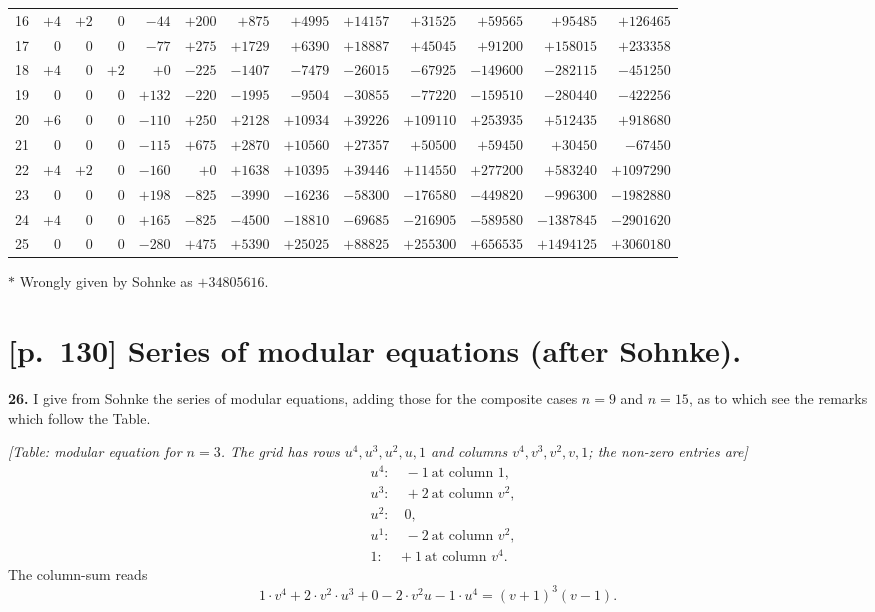 \documentclass[11pt]{article}
\providecommand{\asterism}{*}
\begin{document}
\begin{table}
\begin{tabular}{r|r|r|r|r|r|r|r|r|r|r|r|r}
16 & $+4$ & $+2$ & $0$ & $-44$ & $+200$ & $+875$ & $+4995$ & $+14157$ & $+31525$ & $+59565$ & $+95485$ & $+126465$ \\
17 & $0$ & $0$ & $0$ & $-77$ & $+275$ & $+1729$ & $+6390$ & $+18887$ & $+45045$ & $+91200$ & $+158015$ & $+233358$ \\
18 & $+4$ & $0$ & $+2$ & $+0$ & $-225$ & $-1407$ & $-7479$ & $-26015$ & $-67925$ & $-149600$ & $-282115$ & $-451250$ \\
19 & $0$ & $0$ & $0$ & $+132$ & $-220$ & $-1995$ & $-9504$ & $-30855$ & $-77220$ & $-159510$ & $-280440$ & $-422256$ \\
20 & $+6$ & $0$ & $0$ & $-110$ & $+250$ & $+2128$ & $+10934$ & $+39226$ & $+109110$ & $+253935$ & $+512435$ & $+918680$ \\
21 & $0$ & $0$ & $0$ & $-115$ & $+675$ & $+2870$ & $+10560$ & $+27357$ & $+50500$ & $+59450$ & $+30450$ & $-67450$ \\
22 & $+4$ & $+2$ & $0$ & $-160$ & $+0$ & $+1638$ & $+10395$ & $+39446$ & $+114550$ & $+277200$ & $+583240$ & $+1097290$ \\
23 & $0$ & $0$ & $0$ & $+198$ & $-825$ & $-3990$ & $-16236$ & $-58300$ & $-176580$ & $-449820$ & $-996300$ & $-1982880$ \\
24 & $+4$ & $0$ & $0$ & $+165$ & $-825$ & $-4500$ & $-18810$ & $-69685$ & $-216905$ & $-589580$ & $-1387845$ & $-2901620$ \\
25 & $0$ & $0$ & $0$ & $-280$ & $+475$ & $+5390$ & $+25025$ & $+88825$ & $+255300$ & $+656535$ & $+1494125$ & $+3060180$ \\
\hline
\end{tabular}

\vspace{1ex}
{\footnotesize $\asterism$ Wrongly given by Sohnke as $+34805616$.}
\end{table}

\clearpage
\section*{[p.~130] Series of modular equations (after Sohnke).}

\textbf{26.} I give from Sohnke the series of modular equations, adding
those for the composite cases $n=9$ and $n=15$, as to which see the
remarks which follow the Table.

\medskip
\textit{[Table: modular equation for $n=3$. The grid has rows
$u^4, u^3, u^2, u, 1$ and columns $v^4, v^3, v^2, v, 1$; the non-zero
entries are]}
\[
\begin{aligned}
&u^4: \quad -1 \ \text{at column }1, \\
&u^3: \quad +2 \ \text{at column }v^2, \\
&u^2: \quad 0, \\
&u^1: \quad -2 \ \text{at column }v^2, \\
&1: \quad +1 \ \text{at column }v^4.
\end{aligned}
\]
The column-sum reads
\[
1 \cdot v^4 + 2\cdot v^2 \cdot u^3 + 0 - 2\cdot v^2 u - 1\cdot u^4 = (v+1)^3 (v-1).
\]
\end{document}
